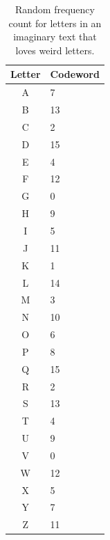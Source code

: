 \documentclass{article}
\begin{document}
\begin{enumerate}
        \begin{flushleft}
        \begin{table}[ht]
            \caption{Random frequency count for letters in an imaginary text
            that loves weird letters.}
            \label{tab:prefixfree}
            \begin{tabular}{cl}
                \toprule
                \textbf{Letter} & \textbf{Codeword} \\
                \midrule
                A &  7\\
                B & 13\\
                C &  2\\
                D & 15\\
                E &  4\\
                F & 12\\
                G &  0\\
                H &  9\\
                I &  5\\
                J & 11\\
                K &  1\\
                L & 14\\
                M &  3\\
                N & 10\\
                O &  6\\
                P &  8\\
                Q & 15\\
                R &  2\\
                S & 13\\
                T &  4\\
                U &  9\\
                V &  0\\
                W & 12\\
                X &  5\\
                Y &  7\\
                Z & 11\\
                \bottomrule
            \end{tabular}
        \end{table}
        \end{flushleft}

\end{enumerate}
\end{document}
